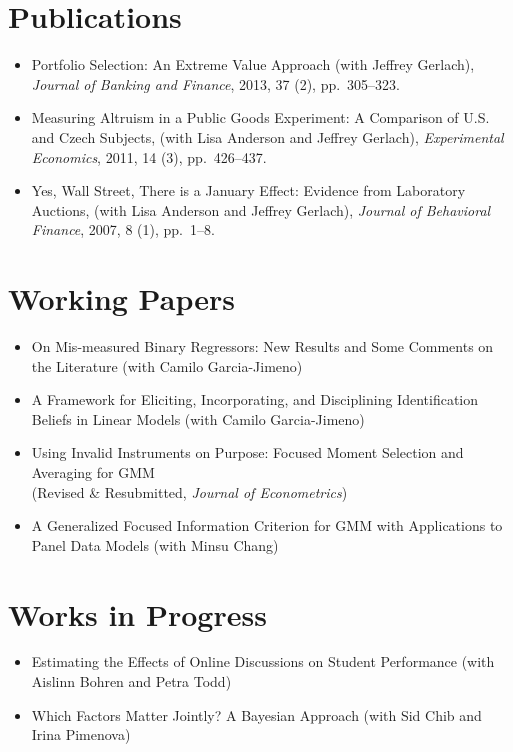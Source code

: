 \documentclass[line,overlapped]{myres}
\begin{document}
\begin{resume}

\section{\sc Publications}
\begin{itemize}
	\item Portfolio Selection: An Extreme Value Approach (with Jeffrey Gerlach), \emph{Journal of Banking and Finance}, 2013, 37 (2), pp.\ 305--323.
	\item Measuring Altruism in a Public Goods Experiment:  A Comparison of U.S. and Czech Subjects, (with Lisa Anderson and Jeffrey Gerlach), \emph{Experimental Economics}, 2011, 14 (3), pp.\ 426--437.
	\item Yes, Wall Street, There is a January Effect: Evidence from Laboratory Auctions, (with Lisa Anderson and Jeffrey Gerlach), \emph{Journal of Behavioral Finance}, 2007, 8 (1), pp.\ 1--8. 
\end{itemize}


\section{\sc Working Papers}
\begin{itemize}
  \item On Mis-measured Binary Regressors: New Results and Some Comments on the Literature (with Camilo Garcia-Jimeno)
	\item A Framework for Eliciting, Incorporating, and Disciplining Identification Beliefs in Linear Models (with Camilo Garcia-Jimeno)
  \item Using Invalid Instruments on Purpose: Focused Moment Selection and Averaging for GMM\\ (Revised \& Resubmitted, \emph{Journal of Econometrics})
	\item A Generalized Focused Information Criterion for GMM with Applications to Panel Data Models (with Minsu Chang)
\end{itemize}




\section{\sc Works in Progress}
\begin{itemize}
  \item Estimating the Effects of Online Discussions on Student Performance (with Aislinn Bohren and Petra Todd)
  \item Which Factors Matter Jointly? A Bayesian Approach (with Sid Chib and Irina Pimenova)
\end{itemize}


\end{resume}
\end{document}
